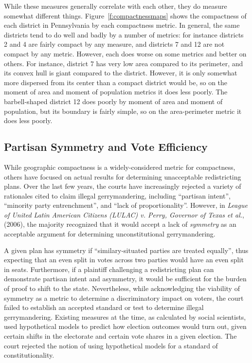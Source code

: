 \documentclass[12pt]{article}
\begin{document}
  While these measures generally correlate with each other, they do measure somewhat different things.  Figure~\ref{f:compactnessmaps} shows the compactness of each district in Pennsylvania by each compactness metric.  In general, the same districts tend to do well and badly by a number of metrics: for instance districts 2 and 4 are fairly compact by any measure, and districts 7 and 12 are not compact by any metric.  However, each does worse on some metrics and better on others.  For instance, district 7 has very low area compared to its perimeter, and its convex hull is giant compared to the district.  However, it is only somewhat more dispersed from its center than a compact district would be, so on the moment of area and moment of population metrics it does less poorly.  The barbell-shaped district 12 does poorly by moment of area and moment of population, but its boundary is fairly simple, so on the area-perimeter metric it does less poorly.

    \subsection{Partisan Symmetry and Vote Efficiency}
 While geographic compactness is a widely-considered metric for compactness, others have focused on actual results for determining unacceptable redistricting plans.  Over the last few years, the courts have increasingly rejected a variety of rationales cited to claim illegal gerrymandering, including ``partisan intent'',  ``minority party entrenchment'', and ``lack of proportionality''.  However, in \textit{League of United Latin American Citizens (LULAC) v. Perry, Governor of Texas et al.}, (2006), the majority recognized that it would accept a lack of \textit{symmetry} as an acceptable argument for determining unconstitutional gerrymandering.

  A given plan has symmetry if ``similary-situated parties are treated equally'', thus expecting that an even split in votes across two parties would have an even split in seats. Furthermore, if a plaintiff challenging a redistricting plan can demonstrate partisan intent and asymmetry, it would be sufficient for the burden of proof to shift to the state.  Nevertheless, while acknowledging the viability of symmetry as a metric to determine a discriminatory impact on voters, the court failed to establish an accepted standard or test to determine illegal gerrymandering.  Existing measures at the time, as calculated by social scientists, used hypothetical models to predict how election outcomes would turn out, given certain shifts in the electorate and certain vote shares in a given election. The court rejected the notion of using hypothetical models for a standard of constitutionality. \cite{LULAC}
\end{document}
